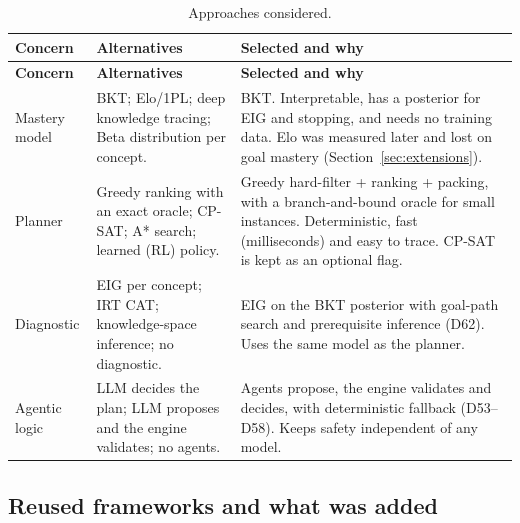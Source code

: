 \documentclass[11pt,a4paper]{article}
\begin{document}
\begin{xltabular}{\textwidth}{
    @{}
    >{\raggedright\arraybackslash}p{0.17\textwidth}
    >{\raggedright\arraybackslash}X
    >{\raggedright\arraybackslash}X
    @{}
}
\caption{Approaches considered.}
\label{tab:alternatives}\\
\toprule
\textbf{Concern} & \textbf{Alternatives} & \textbf{Selected and why} \\
\midrule
\endfirsthead
\toprule
\textbf{Concern} & \textbf{Alternatives} & \textbf{Selected and why} \\
\midrule
\endhead
\bottomrule
\endfoot
Mastery model & BKT; Elo/1PL; deep knowledge tracing; Beta distribution per concept. & BKT. Interpretable, has a posterior for EIG and stopping, and needs no training data. Elo was measured later and lost on goal mastery (Section~\ref{sec:extensions}). \\
Planner & Greedy ranking with an exact oracle; CP-SAT; A* search; learned (RL) policy. & Greedy hard-filter + ranking + packing, with a branch-and-bound oracle for small instances. Deterministic, fast (milliseconds) and easy to trace. CP-SAT is kept as an optional flag. \\
Diagnostic & EIG per concept; IRT CAT; knowledge-space inference; no diagnostic. & EIG on the BKT posterior with goal-path search and prerequisite inference (D62). Uses the same model as the planner. \\
Agentic logic & LLM decides the plan; LLM proposes and the engine validates; no agents. & Agents propose, the engine validates and decides, with deterministic fallback (D53--D58). Keeps safety independent of any model. \\
\end{xltabular}

\subsection{Reused frameworks and what was added}
\end{document}
